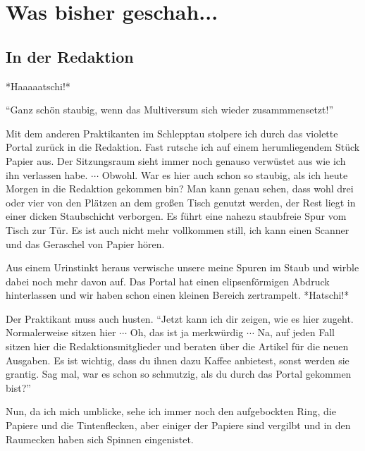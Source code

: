 \documentclass[final]{multiversum}
\begin{document}
\makemultititle
%

\section{Was bisher geschah...}


\subsection{In der Redaktion}
*Haaaaatschi!*

\enquote{Ganz schön staubig, wenn das Multiversum sich wieder zusammmensetzt!}

Mit dem anderen Praktikanten im Schlepptau stolpere ich durch das violette Portal zurück in die Redaktion.
Fast rutsche ich auf einem herumliegendem Stück Papier aus.
Der Sitzungsraum sieht immer noch genauso verwüstet aus wie ich ihn verlassen habe.
$\cdots$ Obwohl.
War es hier auch schon so staubig, als ich heute Morgen in die Redaktion gekommen bin? 
Man kann genau sehen, dass wohl drei oder vier von den Plätzen an dem großen Tisch genutzt werden, der Rest liegt in einer dicken Staubschicht verborgen.
Es führt eine nahezu staubfreie Spur vom Tisch zur Tür.
Es ist auch nicht mehr vollkommen still, ich kann einen Scanner und das Geraschel von Papier hören.

Aus einem Urinstinkt heraus verwische unsere meine Spuren im Staub und wirble dabei noch mehr davon auf. 
Das Portal hat einen elipsenförmigen Abdruck hinterlassen und wir haben schon einen kleinen Bereich zertrampelt.
*Hatschi!*

Der Praktikant muss auch husten.
\enquote{Jetzt kann ich dir zeigen, wie es hier zugeht.
Normalerweise sitzen hier $\cdots$
Oh, das ist ja merkwürdig $\cdots$
Na, auf jeden Fall sitzen hier die Redaktionsmitglieder und beraten über die Artikel für die neuen Ausgaben.
Es ist wichtig, dass du ihnen dazu Kaffee anbietest, sonst werden sie grantig.
Sag mal, war es schon so schmutzig, als du durch das Portal gekommen bist?}

Nun, da ich mich umblicke, sehe ich immer noch den aufgebockten Ring, die Papiere und die Tintenflecken, aber einiger der Papiere sind vergilbt und in den Raumecken haben sich Spinnen eingenistet.
\end{document}
